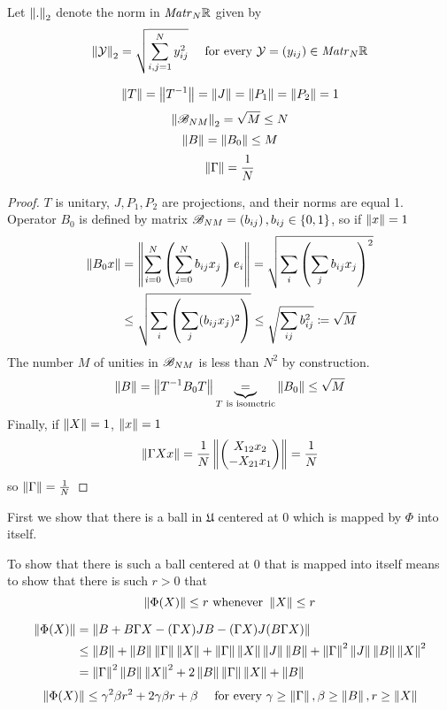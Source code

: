 \documentclass{article}
\begin{document}
Let $\normex{2}{.}$ denote the norm in $\matr{N}{\RR}$ given by
$$\normex{2}{\mathcal Y} = \sqrt{\sum_{i,j=1}^N y_{ij}^2} \quad\text{ for every } \mathcal Y = \left(y_{ij}\right) \in \matr{N}{\RR}$$
\begin{lemma}
    $$\norm T = \norm{T^{-1}} = \norm J = \norm{P_1} = \norm{P_2} = 1$$
    $$\normex{2}{\perturbmatrix{N}{M}} = \sqrt{M} \leq N$$
    $$\norm B = \norm{B_0} \leq M$$
    $$\norm{\Gamma} = \frac{1}{N}$$
\end{lemma}
\begin{proof}
    $T$ is unitary, $J, P_1, P_2$ are projections, and their norms are equal 1.
    Operator $B_0$ is defined by matrix $\perturbmatrix{N}{M} = \left(b_{ij}\right), b_{ij}\in\{0,1\}$,
    so if $\norm x = 1$
    \[
        \begin{split}
            \norm{B_0 x} &= \norm{\sum_{i=0}^N \left(\sum_{j=0}^N b_{ij} x_j\right) e_i}
            = \sqrt{\sum_i \left(\sum_j b_{ij} x_j\right)^2} \\
            &\leq \sqrt{\sum_i \left(\sum_j (b_{ij} x_j)^2\right)}
            \leq \sqrt{\sum_{ij} b_{ij}^2} \eqdef \sqrt M
        \end{split}
    \]
The number $M$ of unities in $\perturbmatrix{N}{M}$ is less than $N^2$ by construction.
$$\norm B = \norm{T^{-1} B_0 T} \underbrace{=}_{T \text{ is isometric}} \norm{B_0} \leq \sqrt M$$
    Finally, if $\norm X = 1$, $\norm x = 1$
    $$\norm{\Gamma X x} = \frac1N \norm{\begin{pmatrix}X_{12}x_2 \\ -X_{21}x_1\end{pmatrix}} = \frac1N$$
    so $\norm\Gamma = \frac1N$
\end{proof}

First we show that there is a ball in $\mathfrak U$ centered at $0$
which is mapped by $\Phi$ into itself.

To show that there is such a ball centered at $0$ that is mapped into itself
means to show that there is such $r>0$ that
$$\norm{\Phi(X)} \leq r \text{ whenever } \norm{X}\leq r$$

    \begin{align*}
        \norm{\Phi(X)} &=    \norm{B + B\Gamma X - (\Gamma X) JB - (\Gamma X)J(B\Gamma X)} \\
                     &\leq \norm{B} + \norm{B}\norm{\Gamma} \norm{X} + \norm{\Gamma}\norm{X}\norm{J}\norm{B} + \norm{\Gamma}^2\norm{J}\norm{B}\norm{X}^2 \\
                     & = \norm{\Gamma}^2\norm{B}\norm{X}^2 + 2\norm{B}\norm{\Gamma}\norm{X} + \norm{B}
    \end{align*}
    \begin{equation}
        \label{eq:phi_norm_b1}
        \norm{\Phi(X)}
        \leq
            \gamma^2\beta r^2 + 2\gamma\beta r + \beta
            \quad \text{ for every } \gamma\geq\norm{\Gamma}, \beta\geq\norm{B}, r\geq\norm{X}
    \end{equation}
\end{document}
